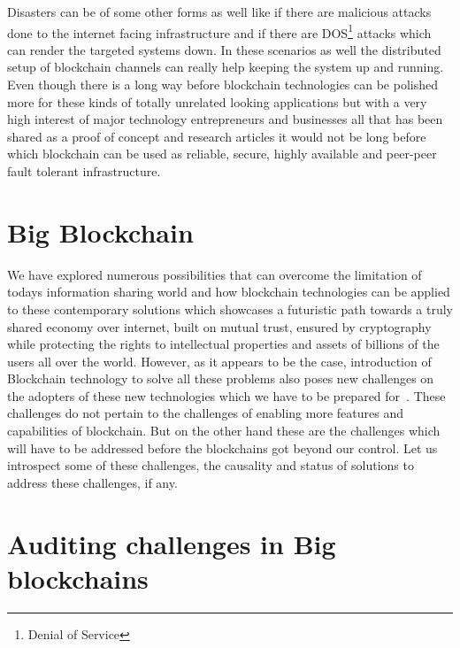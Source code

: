 Disasters can be of some other forms as well like if there are
malicious attacks done to the internet facing infrastructure and if
there are DOS\footnote{Denial of Service} attacks which can render the
targeted systems down. In these scenarios as well the distributed
setup of blockchain channels can really help keeping the system up and
running. Even though there is a long way before blockchain technologies
can be polished more for these kinds of totally unrelated looking
applications but with a very high interest of major technology
entrepreneurs and businesses all that has been shared as a proof of
concept and research articles it would not be long before which
blockchain can be used as reliable, secure, highly available and
peer-peer fault tolerant infrastructure.


\section{Big Blockchain}

We have explored numerous possibilities that can overcome the
limitation of todays information sharing world and how blockchain
technologies can be applied to these contemporary solutions which
showcases a futuristic path towards a truly shared economy over
internet, built on mutual trust, ensured by cryptography while
protecting the rights to intellectual properties and assets of
billions of the users all over the world. However, as it appears to be
the case, introduction of Blockchain technology to solve all these
problems also poses new challenges on the adopters of these new
technologies which we have to be prepared for~\cite{smith31}. These
challenges do not pertain to the challenges of enabling more features
and capabilities of blockchain. But on the other hand these are the
challenges which will have to be addressed before the blockchains got
beyond our control. Let us introspect some of these challenges, the
causality and status of solutions to address these challenges, if any.

\section{Auditing challenges in Big blockchains}

